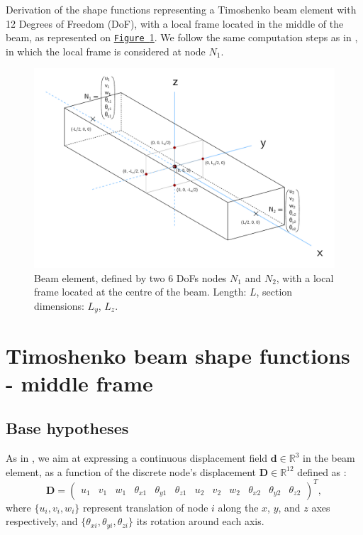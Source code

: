 \documentclass[a4paper,11pt]{article}
\title{}
\author{Camille Krewcun \\ \scriptsize{Inria - DEFROST} }
\date{\today}
\newcommand{\R}{\mathbb{R}}
\newcommand{\bd}{\mathbf{d}}
\newcommand{\bD}{\mathbf{D}}
\newcommand{\te}{\texttt}
\newcommand{\figref}[1]{\hyperref[#1]{\te{Figure \ref{#1}}}}
\begin{document}
\maketitle

Derivation of the shape functions representing a Timoshenko beam element with 12
Degrees of Freedom (DoF), with a local frame located in the middle of the beam, as
represented on \figref{beam_local_middle_frame}. We follow the same computation
steps as in \cite{Baz03}, in which the local frame is considered at node $N_1$.

\begin{figure}[!h]
	\centering
	\includegraphics[scale=0.35]{Images/beam_local_middle_frame}
	\caption{Beam element, defined by two 6 DoFs nodes $N_1$ and $N_2$, with a
local frame located at the centre of the beam. Length: $L$, section dimensions:
$L_y$, $L_z$.}
	\label{beam_local_middle_frame}
\end{figure}

\section*{Timoshenko beam shape functions - middle frame}

\subsection*{Base hypotheses}

As in \cite{Baz03}, we aim at expressing a continuous displacement field $\bd \in
\R^3$ in the beam element, as a function of the discrete node's displacement $\bD
\in \R^{12}$ defined as :
\begin{equation}
\bD =
\begin{pmatrix}
	u_1 & v_1 & w_1 & \theta_{x1} & \theta_{y1} & \theta_{z1} &
	u_2 & v_2 & w_2 & \theta_{x2} & \theta_{y2} & \theta_{z2}
\end{pmatrix}^T,
\end{equation}
where $\{u_i, v_i, w_i\}$ represent translation of node $i$ along the $x$, $y$, and
$z$ axes respectively, and $\{\theta_{xi}, \theta_{yi}, \theta_{zi}\}$ its rotation
around each axis.\\
\end{document}
